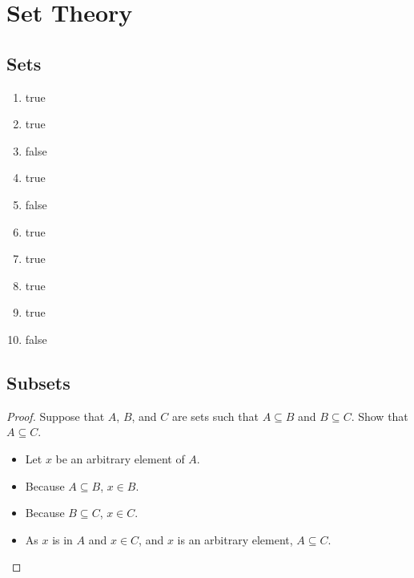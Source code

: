 \section{Set Theory}

\subsection{Sets}
\begin{enumerate}
    \item true
    \item true
    \item false
    \item true
    \item false
    \item true
    \item true
    \item true
    \item true
    \item false
\end{enumerate}

\subsection{Subsets}
\begin{proof}
    Suppose that \(A\), \(B\), and \(C\) are sets such that \(A \subseteq B\) and \(B \subseteq C\). Show that \(A \subseteq C\).
    \begin{itemize}
        \item Let \(x\) be an arbitrary element of \(A\).
        \item Because \(A \subseteq B\), \(x \in B\).
        \item Because \(B \subseteq C\), \(x \in C\).
        \item As \(x\) is in \(A\) and \(x \in C\), and \(x\) is an arbitrary element, \(A \subseteq C\).
    \end{itemize}
\end{proof}


